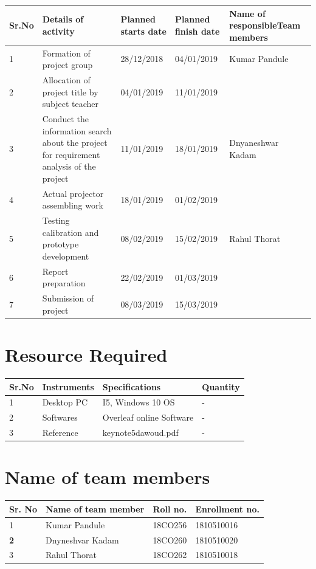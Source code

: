 \documentclass{article}
\begin{document}
\begin{tabular}{|p{0.4in}|p{1.6in}|p{0.8in}|p{0.8in}|p{1.9in}|} \hline 
\textbf{Sr.No} & \textbf{Details of activity} & \textbf{Planned starts date} & \textbf{Planned finish date} & \textbf{Name of responsible\newline Team members} \\ \hline 
1 & Formation of project group  & 28/12/2018 & 04/01/2019 &  Kumar Pandule \\ \hline 
2 & Allocation of project title by subject teacher & 04/01/2019 & 11/01/2019 &  \\ \hline 
3 & Conduct the information search about the project for requirement analysis of the project & 11/01/2019 & 18/01/2019 &  Dnyaneshwar Kadam \\  \hline

4 & Actual projector assembling work & 18/01/2019 & 01/02/2019 &  \\ \hline 

5 & Testing calibration and prototype development & 08/02/2019 & 15/02/2019 &   Rahul Thorat \\ \hline 
6 & Report preparation & 22/02/2019 & 01/03/2019 &  \\ \hline 
7 & Submission of project & 08/03/2019 & 15/03/2019 &  \\ \hline 
\end{tabular}


\section{ Resource Required}


\begin{tabular}{|p{0.4in}|p{1.6in}|p{1.8in}|p{1.9in}|} \hline 
\textbf{Sr.No} & \textbf{Instruments} & \textbf{Specifications} & \textbf{Quantity} \\ \hline 
1 & Desktop PC  & I5, Windows 10 OS & - \\ \hline 
2 & Softwares & Overleaf online Software & - \\ \hline 
3 & Reference  & keynote5dawoud.pdf & - \\ \hline 
\end{tabular}

\textbf{}

\section{ Name of team members}



\begin{tabular}{|p{0.4in}|p{1.6in}|p{1.6in}|p{2.1in}|} \hline 
\textbf{Sr. No} & \textbf{Name of team member} & \textbf{Roll no.} & \textbf{Enrollment no.} \\ \hline 
1 & Kumar Pandule & 18CO256 & 1810510016 \\ \hline 
\textbf{2} & Dnyneshvar Kadam & 18CO260 & 1810510020 \\ \hline 
3 & Rahul Thorat & 18CO262 & 1810510018 \\ \hline 

\end{tabular}
\end{document}
